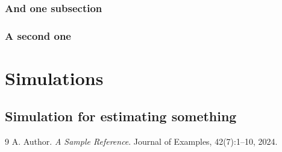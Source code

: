 \documentclass[12pt, a4paper, openany]{book}
\makeatletter
\renewcommand\backmatter{\clearpage\@mainmatterfalse}
\makeatother
\begin{document}
\subsection{And one subsection}
\lipsum[2]
\subsection{A second one}
\lipsum[3]

\chapter{Simulations}
\section{Simulation for estimating something}
\lipsum[1]

\backmatter
\begin{thebibliography}{9}
  A. Author.
  \emph{A Sample Reference}.
  Journal of Examples, 42(7):1--10, 2024.
\end{thebibliography}
\end{document}
